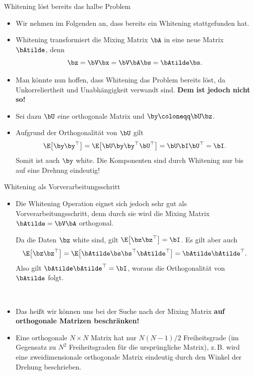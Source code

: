 \begin{frame}{Whitening löst bereits das halbe Problem}{}
	\begin{itemize}
		\item Wir nehmen im Folgenden an, dass bereits ein Whitening stattgefunden hat.
		\item Whitening transformiert die Mixing Matrix $\bA$ in eine neue Matrix $\bAtilde$, denn
			$$\bz = \bV \bx = \bV \bA \bs = \bAtilde \bs.$$
		\item Man könnte nun hoffen, dass Whitening das Problem bereits löst,
			da Unkorreliertheit und Unabhängigkeit verwandt sind. \textbf{Dem ist jedoch nicht so!}
		\item Sei dazu $\bU$ eine orthogonale Matrix und $\by \coloneqq \bU \bz$.
		\item Aufgrund der Orthogonalität von $\bU$ gilt
			$$\E\bigl[ \by \by^\top \bigr] = \E\bigl[ \bU \by \by^\top \bU^\top \bigr] = \bU \bI \bU^\top = \bI.$$
			Somit ist auch $\by$ white. Die Komponenten sind durch Whitening nur bis auf eine Drehung eindeutig!
	\end{itemize}
\end{frame}


\begin{frame}{Whitening als Vorverarbeitungsschritt}{}
	\begin{itemize}
		\item Die Whitening Operation eignet sich jedoch sehr gut als Vorverarbeitungsschritt,
			denn durch sie wird die Mixing Matrix $\bAtilde = \bV \bA$ orthogonal. \\ \vspace*{2mm}
		\begin{myproof}
			Da die Daten $\bz$ white sind, gilt $\E\bigl[ \bz \bz^\top \bigr] = \bI$. Es gilt aber auch
			\begin{equation*}
				\E\bigl[ \bz \bz^\top \bigr]
					= \E\bigl[ \bAtilde \bs \bs^\top \bAtilde^\top \bigr]
					= \bAtilde \bAtilde^\top.
			\end{equation*}
			Also gilt $\bAtilde \bAtilde^\top = \bI$, woraus die Orthogonalität von $\bAtilde$ folgt.
		\end{myproof} \\ \vspace*{1mm}
		\item Das heißt wir können uns bei der Suche nach der Mixing Matrix \textbf{auf orthogonale Matrizen beschränken!}
		\item Eine orthogonale $N \times N$ Matrix hat nur $N (N - 1) / 2$ Freiheitsgrade
			(im Gegensatz zu $N^2$ Freiheitsgraden für die ursprüngliche Matrix),
			z.\,B. wird eine zweidimensionale orthogonale Matrix eindeutig durch den Winkel der Drehung beschrieben.
	\end{itemize}
\end{frame}


